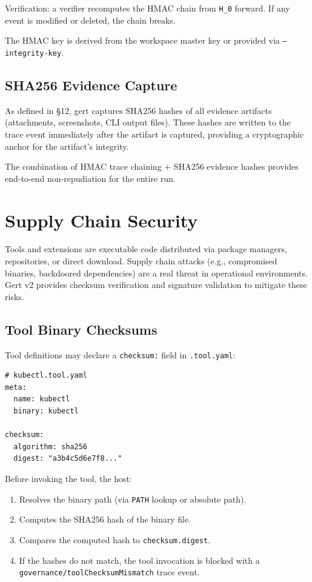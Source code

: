 Verification: a verifier recomputes the HMAC chain from \texttt{H\_0} forward.
If any event is modified or deleted, the chain breaks.

The HMAC key is derived from the workspace master key or provided via
\texttt{--integrity-key}.

\subsection{SHA256 Evidence Capture}

As defined in §12, gert captures SHA256 hashes of all evidence artifacts
(attachments, screenshots, CLI output files).  These hashes are written to the
trace event immediately after the artifact is captured, providing a
cryptographic anchor for the artifact's integrity.

The combination of HMAC trace chaining + SHA256 evidence hashes provides
end-to-end non-repudiation for the entire run.

\section{Supply Chain Security}
\label{sec:supply-chain}

Tools and extensions are executable code distributed via package managers,
repositories, or direct download.  Supply chain attacks (e.g., compromised
binaries, backdoored dependencies) are a real threat in operational
environments.  Gert v2 provides checksum verification and signature validation
to mitigate these risks.

\subsection{Tool Binary Checksums}

Tool definitions may declare a \texttt{checksum:} field in
\texttt{.tool.yaml}:

\begin{verbatim}
# kubectl.tool.yaml
meta:
  name: kubectl
  binary: kubectl

checksum:
  algorithm: sha256
  digest: "a3b4c5d6e7f8..."
\end{verbatim}

Before invoking the tool, the host:

\begin{enumerate}
  \item Resolves the binary path (via \texttt{PATH} lookup or absolute path).
  \item Computes the SHA256 hash of the binary file.
  \item Compares the computed hash to \texttt{checksum.digest}.
  \item If the hashes do not match, the tool invocation is blocked with a
        \texttt{governance/toolChecksumMismatch} trace event.
\end{enumerate}

